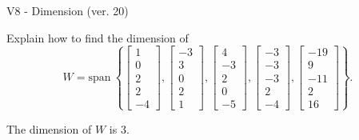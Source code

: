 \begin{exercise}
  \begin{exerciseTitle}V8 - Dimension (ver. 20)\end{exerciseTitle}
  \begin{exerciseStatement}
    Explain how to find the dimension of 
\[W=\mathrm{span}\ \left\{\left[\begin{array}{r}
1 \\
0 \\
2 \\
2 \\
-4
\end{array}\right] , \left[\begin{array}{r}
-3 \\
3 \\
0 \\
2 \\
1
\end{array}\right] , \left[\begin{array}{r}
4 \\
-3 \\
2 \\
0 \\
-5
\end{array}\right] , \left[\begin{array}{r}
-3 \\
-3 \\
-3 \\
2 \\
-4
\end{array}\right] , \left[\begin{array}{r}
-19 \\
9 \\
-11 \\
2 \\
16
\end{array}\right]\right\}.\]



  \end{exerciseStatement}
  \begin{exerciseAnswer}
   The dimension of \(W\) is  \(3\).
  


  \end{exerciseAnswer}
\end{exercise}